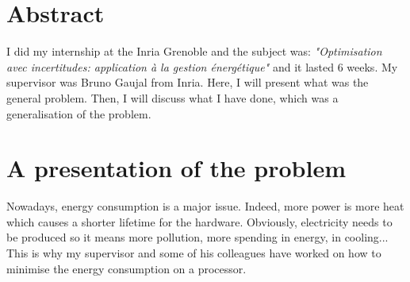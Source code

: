 \documentclass[
10pt, %
a4paper, %
oneside, %
headinclude,footinclude, %
BCOR5mm, %
]{scrartcl}
\title{\normalfont\spacedallcaps{Internship report}} %
\author{\spacedlowsmallcaps{Vincent RÉBISCOUL}} %
\date{} %
\begin{document}

\renewcommand{\sectionmark}[1]{\markright{\spacedlowsmallcaps{#1}}} %
\lehead{\mbox{\llap{\small\thepage\kern1em\color{halfgray} \vline}\color{halfgray}\hspace{0.5em}\rightmark\hfil}} %

\pagestyle{scrheadings} %


\maketitle %

\setcounter{tocdepth}{2} %

\tableofcontents %
\section*{Abstract}
I did my internship at the Inria Grenoble and the subject was:
\textit{"Optimisation avec incertitudes: application à la gestion
  énergétique"} and it lasted 6 weeks. My supervisor was Bruno Gaujal
from  Inria. Here, I will present what was the general problem. Then,
I will discuss what I have done, which was a generalisation of the
problem. 


\newpage %

\section{A presentation of the problem}
Nowadays, energy consumption is a major issue. Indeed, more power is
more heat which causes a shorter lifetime for the hardware. Obviously,
electricity needs to be produced so it means more pollution, more
spending in energy, in cooling... This is
why my supervisor and some of his colleagues have worked on how to minimise the
energy consumption on a processor.
\end{document}
